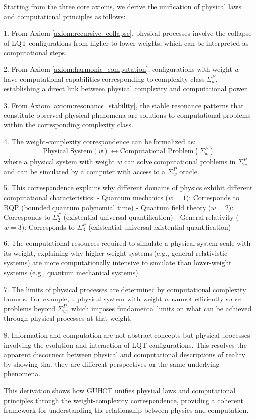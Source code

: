 \documentclass[11pt,a4paper]{article}
\makeatletter
\renewenvironment{proof}[1][\proofname]{\par
  \pushQED{\qed}%
  \normalfont \topsep6\p@\@plus6\p@\relax
  \trivlist
  \item[\hskip\labelsep
        \itshape
    #1\@addpunct{.}]\ignorespaces
}{%
  \popQED\endtrivlist\@endpefalse
}
\makeatother
\begin{document}
\begin{proof}
Starting from the three core axioms, we derive the unification of physical laws and computational principles as follows:

1. From Axiom \ref{axiom:recursive_collapse}, physical processes involve the collapse of LQT configurations from higher to lower weights, which can be interpreted as computational steps.

2. From Axiom \ref{axiom:harmonic_computation}, configurations with weight $w$ have computational capabilities corresponding to complexity class $\Sigma_w^P$, establishing a direct link between physical complexity and computational power.

3. From Axiom \ref{axiom:resonance_stability}, the stable resonance patterns that constitute observed physical phenomena are solutions to computational problems within the corresponding complexity class.

4. The weight-complexity correspondence can be formalized as:
   \begin{equation}
   \text{Physical System}(w) \leftrightarrow \text{Computational Problem}(\Sigma_w^P)
   \end{equation}
   where a physical system with weight $w$ can solve computational problems in $\Sigma_w^P$ and can be simulated by a computer with access to a $\Sigma_w^P$ oracle.

5. This correspondence explains why different domains of physics exhibit different computational characteristics:
   - Quantum mechanics ($w=1$): Corresponds to BQP (bounded quantum polynomial time)
   - Quantum field theory ($w=2$): Corresponds to $\Sigma_2^P$ (existential-universal quantification)
   - General relativity ($w=3$): Corresponds to $\Sigma_3^P$ (existential-universal-existential quantification)

6. The computational resources required to simulate a physical system scale with its weight, explaining why higher-weight systems (e.g., general relativistic systems) are more computationally intensive to simulate than lower-weight systems (e.g., quantum mechanical systems).

7. The limits of physical processes are determined by computational complexity bounds. For example, a physical system with weight $w$ cannot efficiently solve problems beyond $\Sigma_w^P$, which imposes fundamental limits on what can be achieved through physical processes at that weight.

8. Information and computation are not abstract concepts but physical processes involving the evolution and interaction of LQT configurations. This resolves the apparent disconnect between physical and computational descriptions of reality by showing that they are different perspectives on the same underlying phenomena.

This derivation shows how GUHCT unifies physical laws and computational principles through the weight-complexity correspondence, providing a coherent framework for understanding the relationship between physics and computation.
\end{proof}
\end{document}
